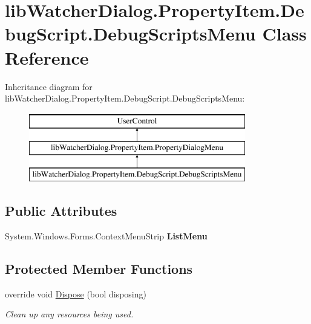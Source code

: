 \hypertarget{classlib_watcher_dialog_1_1_property_item_1_1_debug_script_1_1_debug_scripts_menu}{\section{lib\+Watcher\+Dialog.\+Property\+Item.\+Debug\+Script.\+Debug\+Scripts\+Menu Class Reference}
\label{classlib_watcher_dialog_1_1_property_item_1_1_debug_script_1_1_debug_scripts_menu}
}
Inheritance diagram for lib\+Watcher\+Dialog.\+Property\+Item.\+Debug\+Script.\+Debug\+Scripts\+Menu\+:\begin{figure}[H]
\begin{center}
\leavevmode
\includegraphics[height=3.000000cm]{classlib_watcher_dialog_1_1_property_item_1_1_debug_script_1_1_debug_scripts_menu}
\end{center}
\end{figure}
\subsection*{Public Attributes}
\begin{DoxyCompactItemize}
\item 
\hypertarget{classlib_watcher_dialog_1_1_property_item_1_1_debug_script_1_1_debug_scripts_menu_aac6542768787f7afdd248d3b010bd243}{System.\+Windows.\+Forms.\+Context\+Menu\+Strip {\bfseries List\+Menu}}\label{classlib_watcher_dialog_1_1_property_item_1_1_debug_script_1_1_debug_scripts_menu_aac6542768787f7afdd248d3b010bd243}

\end{DoxyCompactItemize}
\subsection*{Protected Member Functions}
\begin{DoxyCompactItemize}
\item 
override void \hyperlink{classlib_watcher_dialog_1_1_property_item_1_1_debug_script_1_1_debug_scripts_menu_af6707cb54ba7e7762d18f5efc4c65e13}{Dispose} (bool disposing)
\begin{DoxyCompactList}\small\item\em Clean up any resources being used. \end{DoxyCompactList}\end{DoxyCompactItemize}
